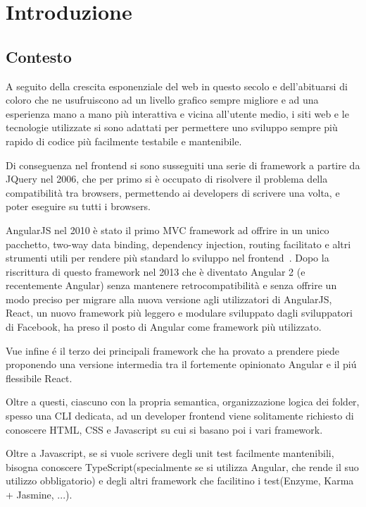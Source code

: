 \chapter{Introduzione}\label{cap:introduzione}

\section{Contesto}\label{sez:contesto}

A seguito della crescita esponenziale del web in questo secolo e dell'abituarsi di coloro che ne usufruiscono ad un livello grafico sempre migliore e ad una esperienza mano a mano pi\`u interattiva e vicina all'utente medio, i siti web e le tecnologie utilizzate si sono adattati per permettere uno sviluppo sempre pi\`u rapido di codice pi\`u facilmente testabile e mantenibile.

Di conseguenza nel frontend si sono susseguiti una serie di framework a partire da JQuery nel 2006, che per primo si \`e occupato di risolvere il problema della compatibilit\`a tra browsers, permettendo ai developers di scrivere una volta, e poter eseguire su tutti i browsers.

AngularJS nel 2010 \`e stato il primo MVC framework ad offrire in un unico pacchetto, two-way data binding, dependency injection, routing facilitato e altri strumenti utili per rendere pi\`u standard lo sviluppo nel frontend~\cite{Hoff}.
Dopo la riscrittura di questo framework nel 2013 che \`e diventato Angular 2 (e recentemente Angular) senza mantenere retrocompatibilit\`a e senza offrire un modo preciso per migrare alla nuova versione agli utilizzatori di AngularJS, React, un nuovo framework pi\`u leggero e modulare sviluppato dagli sviluppatori di Facebook, ha preso il posto di Angular come framework pi\`u utilizzato.

Vue infine \'e il terzo dei principali framework che ha provato a prendere piede proponendo una versione intermedia tra il fortemente opinionato Angular e il pi\'u flessibile React.

Oltre a questi, ciascuno con la propria semantica, organizzazione logica dei folder, spesso una CLI dedicata, ad un developer frontend viene solitamente richiesto di conoscere HTML, CSS e Javascript su cui si basano poi i vari framework.

Oltre a Javascript, se si vuole scrivere degli unit test facilmente mantenibili, bisogna conoscere TypeScript(specialmente se si utilizza Angular, che rende il suo utilizzo obbligatorio) e degli altri framework che facilitino i test(Enzyme, Karma + Jasmine, ...).

